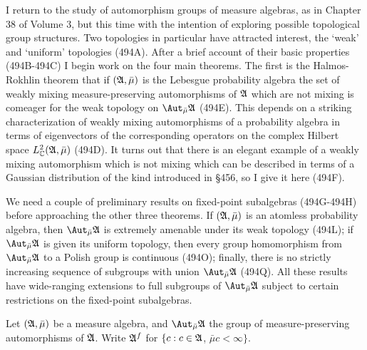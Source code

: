 

\def\glitem#1{{\it #1}\enskip}
\def\mag{\mathop{\text{mag}}\nolimits}

\def\chaptername{Further topics}
\def\sectionname{Groups of measure-preserving automorphisms}


I return to the study of automorphism groups of measure algebras,
as in Chapter 38 of Volume 3, but this time with the
intention of exploring possible topological group structures.
Two topologies in particular have attracted interest,
the `weak' and `uniform' topologies
(494A).   After a brief account of their basic properties
(494B-494C) %
I begin work on the four main theorems.   The first is the Halmos-Rokhlin
theorem that if $(\frak A,\bar\mu)$ is the Lebesgue
probability algebra the set of weakly mixing measure-preserving
automorphisms of $\frak A$ which are not mixing is comeager for the weak
topology on $\AmuA$ (494E).   This depends on a striking characterization
of weakly mixing automorphisms of a probability algebra
in terms of eigenvectors of the corresponding operators on
the complex Hilbert space $L^2_{\Bbb C}(\frak A,\bar\mu)$ 
(494D).   
It turns out that there is an elegant example of a weakly
mixing automorphism which is not mixing which can be described in terms of
a Gaussian distribution of the kind introduced in \S456, so I give it here
(494F).

We need a couple of preliminary results on fixed-point
subalgebras (494G-494H) before approaching the other three theorems.
If $(\frak A,\bar\mu)$ is an atomless
probability algebra, then $\AmuA$ is extremely amenable under its weak
topology (494L);  if $\AmuA$ is given its uniform topology, then every
group homomorphism from $\AmuA$ to a Polish group is continuous (494O);
finally, there is no strictly increasing sequence of subgroups with union
$\AmuA$ (494Q).   All these results have wide-ranging extensions to
full subgroups of $\AmuA$ subject to certain restrictions on the
fixed-point subalgebras.


Let $(\frak A,\bar\mu)$ be a measure algebra,
and $\AmuA$ the group of measure-preserving automorphisms of
$\frak A$.
Write $\frak A^f$ for $\{c:c\in\frak A$, $\bar\mu c<\infty\}$.

